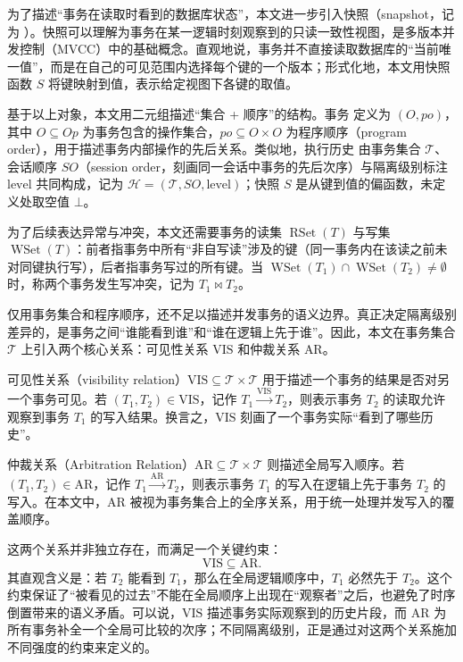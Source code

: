 为了描述“事务在读取时看到的数据库状态”，本文进一步引入快照（snapshot，记为 \Snapshot）。快照可以理解为事务在某一逻辑时刻观察到的只读一致性视图，是多版本并发控制（MVCC）中的基础概念。直观地说，事务并不直接读取数据库的“当前唯一值”，而是在自己的可见范围内选择每个键的一个版本；形式化地，本文用快照函数 $S$ 将键映射到值，表示给定视图下各键的取值。

基于以上对象，本文用二元组描述``集合 + 顺序''的结构。事务 \Txc 定义为 $(O, po)$，其中 $O \subseteq Op$ 为事务包含的操作集合，$po \subseteq O \times O$ 为程序顺序（program order），用于描述事务内部操作的先后关系。类似地，执行历史 \History 由事务集合 $\mathcal{T}$、会话顺序 $SO$（session order，刻画同一会话中事务的先后次序）与隔离级别标注 $\text{level}$ 共同构成，记为 $\mathcal{H} = (\mathcal{T}, SO, \text{level})$；快照 $S$ 是从键到值的偏函数，未定义处取空值 $\bot$。

为了后续表达异常与冲突，本文还需要事务的读集 $\operatorname{RSet}(T)$ 与写集 $\operatorname{WSet}(T)$：前者指事务中所有``非自写读''涉及的键（同一事务内在该读之前未对同键执行写），后者指事务写过的所有键。当 $\operatorname{WSet}(T_1) \cap \operatorname{WSet}(T_2) \neq \emptyset$ 时，称两个事务发生写冲突，记为 $T_1 \bowtie T_2$。

\label{sec:visandar}
仅用事务集合和程序顺序，还不足以描述并发事务的语义边界。真正决定隔离级别差异的，是事务之间“谁能看到谁”和“谁在逻辑上先于谁”。因此，本文在事务集合 $\mathcal{T}$ 上引入两个核心关系：可见性关系 $\text{VIS}$ 和仲裁关系 $\text{AR}$。

可见性关系（visibility relation）$\text{VIS} \subseteq \mathcal{T} \times \mathcal{T}$ 用于描述一个事务的结果是否对另一个事务可见。若 $(T_1, T_2) \in \text{VIS}$，记作 $T_1 \xrightarrow{\text{VIS}} T_2$，则表示事务 $T_2$ 的读取允许观察到事务 $T_1$ 的写入结果。换言之，$\text{VIS}$ 刻画了一个事务实际“看到了哪些历史”。

仲裁关系（Arbitration Relation）$\text{AR} \subseteq \mathcal{T} \times \mathcal{T}$ 则描述全局写入顺序。若 $(T_1, T_2) \in \text{AR}$，记作 $T_1 \xrightarrow{\text{AR}} T_2$，则表示事务 $T_1$ 的写入在逻辑上先于事务 $T_2$ 的写入。在本文中，$\text{AR}$ 被视为事务集合上的全序关系，用于统一处理并发写入的覆盖顺序。

这两个关系并非独立存在，而满足一个关键约束：
\[
    \text{VIS} \subseteq \text{AR}.
\]
其直观含义是：若 $T_2$ 能看到 $T_1$，那么在全局逻辑顺序中，$T_1$ 必然先于 $T_2$。这个约束保证了“被看见的过去”不能在全局顺序上出现在“观察者”之后，也避免了时序倒置带来的语义矛盾。可以说，$\text{VIS}$ 描述事务实际观察到的历史片段，而 $\text{AR}$ 为所有事务补全一个全局可比较的次序；不同隔离级别，正是通过对这两个关系施加不同强度的约束来定义的。

